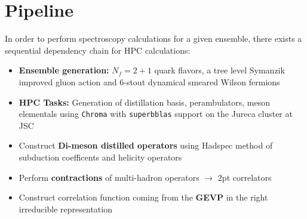 \section{Pipeline}
In order to perform spectroscopy calculations for a given ensemble, there exists a sequential dependency chain for HPC calculations:
\begin{itemize}
     \setlength\itemsep{1em}
        \item[\checkmark] \textbf{Ensemble generation:} $N_f = 2+1$ quark flavors, a tree level Symanzik improved gluon action and 6-stout dynamical smeared Wilson fermions
        \item[\checkmark] \textbf{HPC Tasks:} Generation of distillation basis, perambulators, meson elementals using \texttt{Chroma} with \texttt{superbblas} support on the Jureca cluster at JSC
        \item Construct \textbf{Di-meson distilled operators} using Hadspec method of subduction coefficents and helicity operators
        \item[\checkmark] Perform \textbf{contractions} of multi-hadron operators $\to$ 2pt correlators
        \item Construct correlation function coming from the \textbf{GEVP} in the right irreducible representation
    \end{itemize}
